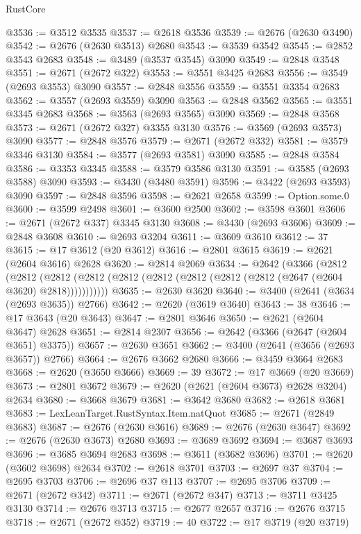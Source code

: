 \begin{lexlean}{RustCore}
\begin{coremodule}
@3536 := @3512 @3535
@3537 := @2618 @3536
@3539 := @2676 (@2630 @3490)
@3542 := @2676 (@2630 @3513) @2680
@3543 := @3539 @3542
@3545 := @2852 @3543 @2683
@3548 := @3489 (@3537 @3545) @3090
@3549 := @2848 @3548
@3551 := @2671 (@2672 @322)
@3553 := @3551 @3425 @2683
@3556 := @3549 (@2693 @3553) @3090
@3557 := @2848 @3556
@3559 := @3551 @3354 @2683
@3562 := @3557 (@2693 @3559) @3090
@3563 := @2848 @3562
@3565 := @3551 @3345 @2683
@3568 := @3563 (@2693 @3565) @3090
@3569 := @2848 @3568
@3573 := @2671 (@2672 @327) @3355 @3130
@3576 := @3569 (@2693 @3573) @3090
@3577 := @2848 @3576
@3579 := @2671 (@2672 @332)
@3581 := @3579 @3346 @3130
@3584 := @3577 (@2693 @3581) @3090
@3585 := @2848 @3584
@3586 := @3353 @3345
@3588 := @3579 @3586 @3130
@3591 := @3585 (@2693 @3588) @3090
@3593 := @3430 (@3480 @3591)
@3596 := @3422 (@2693 @3593) @3090
@3597 := @2848 @3596
@3598 := @2621 @2658
@3599 := Option.some.{0}
@3600 := @3599 @2498
@3601 := @3600 @2500
@3602 := @3598 @3601
@3606 := @2671 (@2672 @337) @3345 @3130
@3608 := @3430 (@2693 @3606)
@3609 := @2848 @3608
@3610 := @2693 @3204
@3611 := @3609 @3610
@3612 := 37
@3615 := @17 @3612 (@20 @3612)
@3616 := @2801 @3615
@3619 := @2621 (@2604 @3616) @2628
@3620 := @2814 @2069
@3634 := @2642
    (@3366
      (@2812
        (@2812
          (@2812 (@2812 (@2812 (@2812 (@2812 (@2812 (@2812 (@2647 (@2604 @3620) @2818)))))))))))
@3635 := @2630 @3620
@3640 := @3400 (@2641 (@3634 (@2693 @3635)) @2766)
@3642 := @2620 (@3619 @3640)
@3643 := 38
@3646 := @17 @3643 (@20 @3643)
@3647 := @2801 @3646
@3650 := @2621 (@2604 @3647) @2628
@3651 := @2814 @2307
@3656 := @2642 (@3366 (@2647 (@2604 @3651) @3375))
@3657 := @2630 @3651
@3662 := @3400 (@2641 (@3656 (@2693 @3657)) @2766)
@3664 := @2676 @3662 @2680
@3666 := @3459 @3664 @2683
@3668 := @2620 (@3650 @3666)
@3669 := 39
@3672 := @17 @3669 (@20 @3669)
@3673 := @2801 @3672
@3679 := @2620 (@2621 (@2604 @3673) @2628 @3204) @2634
@3680 := @3668 @3679
@3681 := @3642 @3680
@3682 := @2618 @3681
@3683 := LexLeanTarget.RustSyntax.Item.natQuot
@3685 := @2671 (@2849 @3683)
@3687 := @2676 (@2630 @3616)
@3689 := @2676 (@2630 @3647)
@3692 := @2676 (@2630 @3673) @2680
@3693 := @3689 @3692
@3694 := @3687 @3693
@3696 := @3685 @3694 @2683
@3698 := @3611 (@3682 @3696)
@3701 := @2620 (@3602 @3698) @2634
@3702 := @2618 @3701
@3703 := @2697 @37
@3704 := @2695 @3703
@3706 := @2696 @37 @113
@3707 := @2695 @3706
@3709 := @2671 (@2672 @342)
@3711 := @2671 (@2672 @347)
@3713 := @3711 @3425 @3130
@3714 := @2676 @3713
@3715 := @2677 @2657
@3716 := @2676 @3715
@3718 := @2671 (@2672 @352)
@3719 := 40
@3722 := @17 @3719 (@20 @3719)

\end{coremodule}
\end{lexlean}
